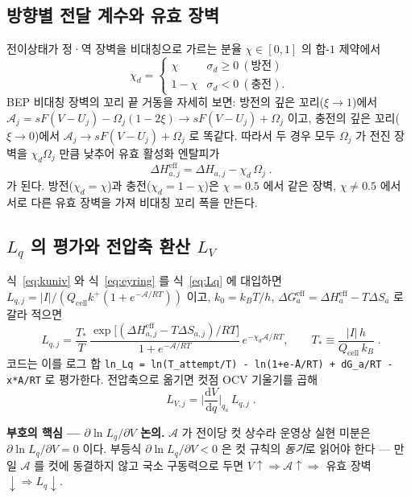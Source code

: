 \documentclass[11pt,a4paper]{article}
\newcommand{\dd}{\mathrm{d}}
\newcommand{\eff}{\mathrm{eff}}
\newcommand{\cell}{\mathrm{cell}}
\newcommand{\code}[1]{\texttt{#1}}
\begin{document}
\subsection{방향별 전달 계수와 유효 장벽}
전이상태가 정·역 장벽을 비대칭으로 가르는 분율 $\chi \in [0,1]$ 의 합-$1$ 제약에서
\begin{equation}
\chi_d=\begin{cases}\chi & \sigma_d\ge0\ (\text{방전})\\ 1-\chi & \sigma_d<0\ (\text{충전}).\end{cases}
\label{eq:chid}
\end{equation}
BEP 비대칭 장벽의 꼬리 끝 거동을 자세히 보면: 방전의 깊은 꼬리($\xi\to1$)에서
$\mathcal A_j=sF(V-U_j)-\Omega_j(1-2\xi)\to sF(V-U_j)+\Omega_j$ 이고,
충전의 깊은 꼬리($\xi\to0$)에서 $\mathcal A_j\to sF(V-U_j)+\Omega_j$ 로 똑같다.
따라서 두 경우 모두 $\Omega_j$ 가 전진 장벽을 $\chi_d\Omega_j$ 만큼 낮추어
유효 활성화 엔탈피가
\begin{equation}
\boxed{\;\Delta H_{a,j}^\eff=\Delta H_{a,j}-\chi_d\,\Omega_j\;.}
\label{eq:dHeff}
\end{equation}
가 된다. 방전($\chi_d=\chi$)과 충전($\chi_d=1-\chi$)은 $\chi=0.5$ 에서 같은 장벽, $\chi\ne0.5$ 에서
서로 다른 유효 장벽을 가져 비대칭 꼬리 폭을 만든다.

\subsection{$L_q$ 의 평가와 전압축 환산 $L_V$}
식~\eqref{eq:kuniv} 와 식~\eqref{eq:eyring} 를 식~\eqref{eq:Lq} 에 대입하면
$L_{q,j} = |I|/(Q_\cell k^+(1+e^{-\mathcal A/RT}))$ 이고, $k_0=k_BT/h$,
$\Delta G_a^\eff = \Delta H_a^\eff - T\Delta S_a$ 로 갈라 적으면
\begin{equation}
\boxed{\;L_{q,j}=\frac{T_*}{T}\,\frac{\exp\!\big[(\Delta H_{a,j}^\eff-T\Delta S_{a,j})/RT\big]}{1+e^{-\mathcal A/RT}}
\,e^{-\chi_d\mathcal A/RT},
\qquad T_*\equiv\frac{|I|\,h}{Q_\cell\,k_B}\;.}
\label{eq:Lqfull}
\end{equation}
코드는 이를 로그 합 \code{ln\_Lq = ln(T\_attempt/T) - ln(1+e\^{-A/RT}) + dG\_a/RT - x*A/RT} 로 평가한다.
전압축으로 옮기면 컷점 OCV 기울기를 곱해
\begin{equation}
\boxed{\;L_{V,j}=\Big|\frac{\dd V}{\dd q}\Big|_{q_a}\,L_{q,j}\;.}
\label{eq:LV}
\end{equation}

\textbf{부호의 핵심 — $\partial\ln L_q/\partial V$ 논의.} $\mathcal A$ 가 전이당 컷 상수라
운영상 실현 미분은 $\partial\ln L_q/\partial V = 0$ 이다. 부등식 $\partial\ln L_q/\partial V < 0$ 은
컷 규칙의 \emph{동기}로 읽어야 한다 — 만일 $\mathcal A$ 를 컷에 동결하지 않고 국소 구동력으로 두면
$V\!\uparrow\Rightarrow\mathcal A\!\uparrow\Rightarrow$ 유효 장벽$\downarrow\Rightarrow L_q\downarrow$.
\end{document}
